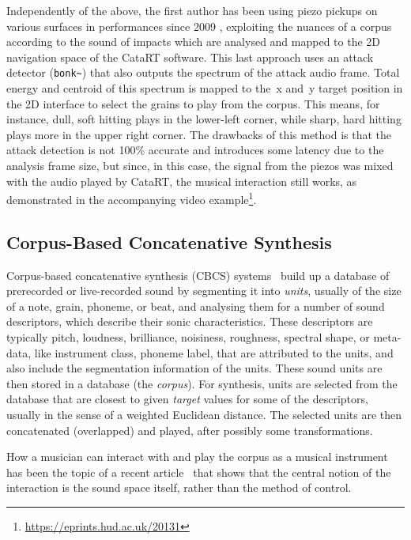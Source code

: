 Independently of the above, the first author has been using piezo pickups on various surfaces in performances since 2009 \cite{Schwarz-nime2012-sound-space}, exploiting the nuances of a corpus according to the sound of impacts which are analysed and mapped to
the 2D navigation space of the CataRT software.
%
This last approach uses an attack detector (\verb|bonk~|) that also outputs the spectrum of the
attack audio frame.  Total energy and centroid of this spectrum is mapped to
the~x and~y target position in the 2D interface to select the grains to play from the corpus.
This means, for instance, dull, soft hitting plays in the lower-left corner, while sharp, hard hitting plays more in the upper right corner.
%
The drawbacks of this method is that the attack detection is not 100\% accurate and introduces some latency due to the analysis frame size, but since, in this case, the signal from the piezos was mixed with the
audio played by CataRT, the musical interaction still works, as demonstrated in the accompanying video example\footnote{\url{https://eprints.hud.ac.uk/20131}\label{videourl}}. %

\subsection{Corpus-Based Concatenative Synthesis}

Corpus-based concatenative synthesis (CBCS) systems~\cite{Schwarz-ieeespm2007-concat} build up a database of prerecorded or live-recorded sound by segmenting it into
\textit{units}, usually of the size of a note, grain, phoneme, or beat, and analysing them for a
number of sound descriptors, which describe their sonic characteristics.
These descriptors are typically pitch, loudness, brilliance, noisiness, roughness, spectral shape, or meta-data, like instrument class, phoneme label, that are attributed to the units,
and also include the segmentation information of the units.
These sound units are then stored in a database (the \textit{corpus}).  For synthesis, units are
selected from the database that are closest to given \textit{target} values for some of the
descriptors, usually in the sense of a weighted Euclidean distance.
The selected units are then concatenated (overlapped) and played, after possibly some transformations.

How a musician can interact with and play the corpus as a musical instrument has been the topic of a recent article~\cite{Schwarz-nime2012-sound-space} that shows that the central notion of the interaction is the sound space itself, rather than the method of control.

